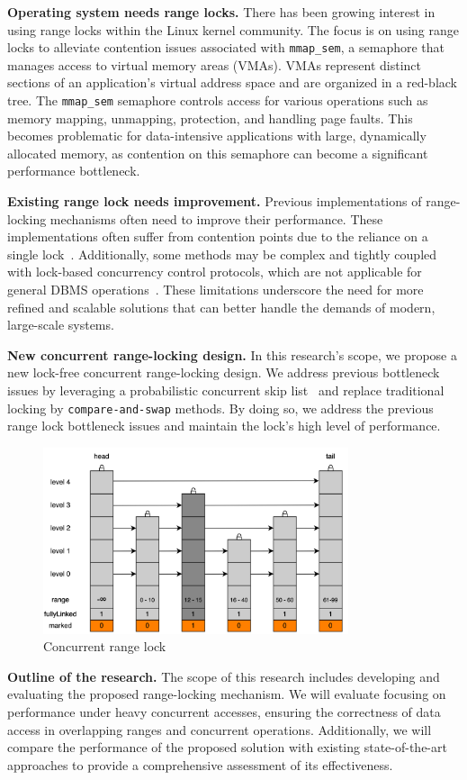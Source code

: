 \textbf{Operating system needs range locks.}
There has been growing interest in using range locks within the Linux kernel community. The focus is on using range locks to alleviate contention issues associated with \texttt{mmap\_sem}, a semaphore that manages access to virtual memory areas (VMAs). VMAs represent distinct sections of an application's virtual address space and are organized in a red-black tree. The \texttt{mmap\_sem} semaphore controls access for various operations such as memory mapping, unmapping, protection, and handling page faults. This becomes problematic for data-intensive applications with large, dynamically allocated memory, as contention on this semaphore can become a significant performance bottleneck.

\textbf{Existing range lock needs improvement.}
Previous implementations of range-locking mechanisms often need to improve their performance. These implementations often suffer from contention points due to the reliance on a single lock~\parencite{linuxRangeLockImpl2013, song2013parallelizing}. Additionally, some methods may be complex and tightly coupled with lock-based concurrency control protocols, which are not applicable for general DBMS operations~\parencite{graefe2007hierarchical, andy2022database}. These limitations underscore the need for more refined and scalable solutions that can better handle the demands of modern, large-scale systems.

\textbf{New concurrent range-locking design.} In this research's scope, we propose a new lock-free concurrent range-locking design. We address previous bottleneck issues by leveraging a probabilistic concurrent skip list~\parencite{herlihy2006provably, herlihy2020art} and replace traditional locking by \texttt{compare-and-swap} methods. By doing so, we address the previous range lock bottleneck issues and maintain the lock's high level of performance.

\begin{figure}[h]
    \centering
    \includegraphics[width=0.8\textwidth]{./figures/concurrent_range_lock.jpg}
    \caption{Concurrent range lock}
    \label{fig:concurrent_range_lock}
\end{figure}

\textbf{Outline of the research.} The scope of this research includes developing and evaluating the proposed range-locking mechanism. We will evaluate focusing on performance under heavy concurrent accesses, ensuring the correctness of data access in overlapping ranges and concurrent operations. Additionally, we will compare the performance of the proposed solution with existing state-of-the-art approaches to provide a comprehensive assessment of its effectiveness.